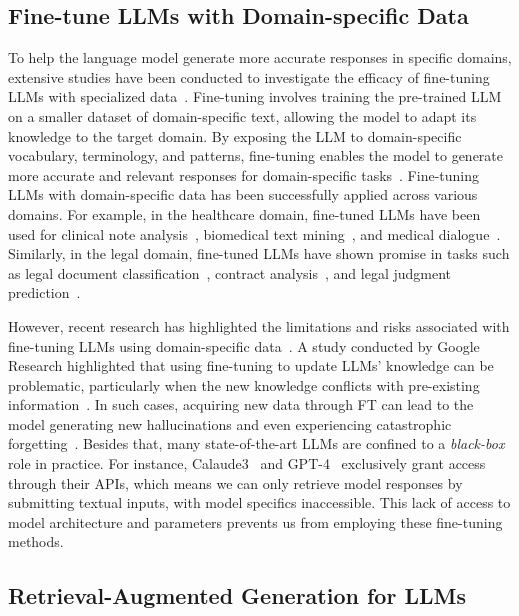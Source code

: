 \documentclass{article}
\theoremstyle{boldremark}
\begin{document}
\subsection{Fine-tune LLMs with Domain-specific Data}
To help the language model generate more accurate responses in specific domains, extensive studies have been conducted to investigate the efficacy of fine-tuning LLMs with specialized data~\cite{gururangan2020don,lee2020patent,lee2020biobert,ge2024openagi}.
Fine-tuning involves training the pre-trained LLM on a smaller dataset of domain-specific text, allowing the model to adapt its knowledge to the target domain. By exposing the LLM to domain-specific vocabulary, terminology, and patterns, fine-tuning enables the model to generate more accurate and relevant responses for domain-specific tasks~\cite{gururangan2020don}. Fine-tuning LLMs with domain-specific data has been successfully applied across various domains. For example, in the healthcare domain, fine-tuned LLMs have been used for clinical note analysis~\cite{alsentzer2019publicly}, biomedical text mining~\cite{lee2020biobert}, and medical dialogue~\cite{valizadeh2022ai}. Similarly, in the legal domain, fine-tuned LLMs have shown promise in tasks such as legal document classification~\cite{chalkidis2019neural}, contract analysis~\cite{chalkidis2021lexglue}, and legal judgment prediction~\cite{zhong2020does}.

However, recent research has highlighted the limitations and risks associated with fine-tuning LLMs using domain-specific data~\cite{korbak2022controlling}. A study conducted by Google Research highlighted that using fine-tuning to update LLMs' knowledge can be problematic, particularly when the new knowledge conflicts with pre-existing information~\cite{gekhman2024does}. In such cases, acquiring new data through FT can lead to the model generating new hallucinations and even experiencing catastrophic forgetting~\cite{korbak2022controlling,yang2024self}. Besides that, many state-of-the-art LLMs are confined to a \emph{black-box} role in practice. For instance, Calaude3~\cite{anthropic2024claude} and GPT-4~\cite{openai2023gpt4} exclusively grant access through their APIs, which means we can only retrieve model responses by submitting textual inputs, with model specifics inaccessible. This lack of access to model architecture and parameters prevents us from employing these fine-tuning methods.


\subsection{Retrieval-Augmented Generation for LLMs}
\end{document}
